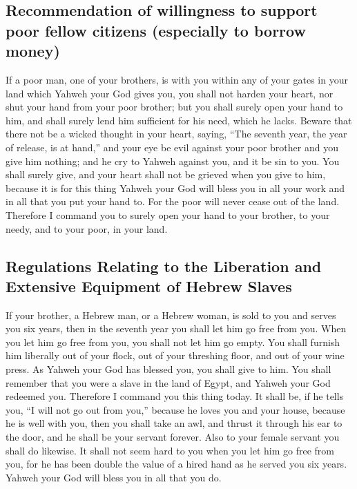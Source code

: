 \hypertarget{recommendation-of-willingness-to-support-poor-fellow-citizens-especially-to-borrow-money}{%
\subsection{Recommendation of willingness to support poor fellow
citizens (especially to borrow
money)}\label{recommendation-of-willingness-to-support-poor-fellow-citizens-especially-to-borrow-money}}

 If a poor man, one of your brothers, is with you within
any of your gates in your land which Yahweh your God gives you, you
shall not harden your heart, nor shut your hand from your poor brother;
 but you shall surely open your hand to him, and shall
surely lend him sufficient for his need, which he lacks. 
Beware that there not be a wicked thought in your heart, saying, ``The
seventh year, the year of release, is at hand,'' and your eye be evil
against your poor brother and you give him nothing; and he cry to Yahweh
against you, and it be sin to you.  You shall surely
give, and your heart shall not be grieved when you give to him, because
it is for this thing Yahweh your God will bless you in all your work and
in all that you put your hand to.  For the poor will
never cease out of the land. Therefore I command you to surely open your
hand to your brother, to your needy, and to your poor, in your land.

\hypertarget{regulations-relating-to-the-liberation-and-extensive-equipment-of-hebrew-slaves}{%
\subsection{Regulations Relating to the Liberation and Extensive
Equipment of Hebrew
Slaves}\label{regulations-relating-to-the-liberation-and-extensive-equipment-of-hebrew-slaves}}

 If your brother, a Hebrew man, or a Hebrew woman, is
sold to you and serves you six years, then in the seventh year you shall
let him go free from you.  When you let him go free from
you, you shall not let him go empty.  You shall furnish
him liberally out of your flock, out of your threshing floor, and out of
your wine press. As Yahweh your God has blessed you, you shall give to
him.  You shall remember that you were a slave in the
land of Egypt, and Yahweh your God redeemed you. Therefore I command you
this thing today.  It shall be, if he tells you, ``I will
not go out from you,'' because he loves you and your house, because he
is well with you,  then you shall take an awl, and thrust
it through his ear to the door, and he shall be your servant forever.
Also to your female servant you shall do likewise.  It
shall not seem hard to you when you let him go free from you, for he has
been double the value of a hired hand as he served you six years. Yahweh
your God will bless you in all that you do.

